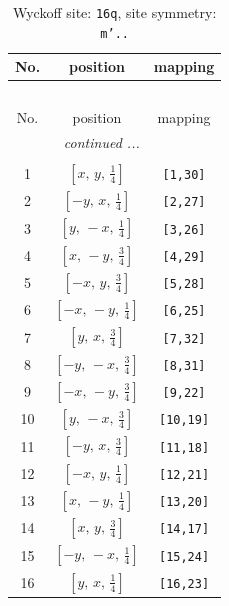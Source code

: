 \documentclass[fleqn,8pt]{jsarticle}
\begin{document}
\begin{longtable}{ccc}
\caption{Wyckoff site: {\tt 16q}, site symmetry: {\tt m'..}}
 \\
 \hline \hline
No. & position & mapping \\ \hline \endfirsthead

\multicolumn{2}{l}{\tablename\ \thetable{}} \\
 \hline \hline
No. & position & mapping \\ \hline \endhead

 \hline \hline
\multicolumn{2}{r}{\footnotesize\it continued ...} \\ \endfoot

 \hline \hline
\multicolumn{2}{r}{} \\ \endlastfoot

1 & $\left[ x,\, y,\, \frac{1}{4} \right]$ & {\tt [1,30]} \\ \hline
2 & $\left[ - y,\, x,\, \frac{1}{4} \right]$ & {\tt [2,27]} \\ \hline
3 & $\left[ y,\, - x,\, \frac{1}{4} \right]$ & {\tt [3,26]} \\ \hline
4 & $\left[ x,\, - y,\, \frac{3}{4} \right]$ & {\tt [4,29]} \\ \hline
5 & $\left[ - x,\, y,\, \frac{3}{4} \right]$ & {\tt [5,28]} \\ \hline
6 & $\left[ - x,\, - y,\, \frac{1}{4} \right]$ & {\tt [6,25]} \\ \hline
7 & $\left[ y,\, x,\, \frac{3}{4} \right]$ & {\tt [7,32]} \\ \hline
8 & $\left[ - y,\, - x,\, \frac{3}{4} \right]$ & {\tt [8,31]} \\ \hline
9 & $\left[ - x,\, - y,\, \frac{3}{4} \right]$ & {\tt [9,22]} \\ \hline
10 & $\left[ y,\, - x,\, \frac{3}{4} \right]$ & {\tt [10,19]} \\ \hline
11 & $\left[ - y,\, x,\, \frac{3}{4} \right]$ & {\tt [11,18]} \\ \hline
12 & $\left[ - x,\, y,\, \frac{1}{4} \right]$ & {\tt [12,21]} \\ \hline
13 & $\left[ x,\, - y,\, \frac{1}{4} \right]$ & {\tt [13,20]} \\ \hline
14 & $\left[ x,\, y,\, \frac{3}{4} \right]$ & {\tt [14,17]} \\ \hline
15 & $\left[ - y,\, - x,\, \frac{1}{4} \right]$ & {\tt [15,24]} \\ \hline
16 & $\left[ y,\, x,\, \frac{1}{4} \right]$ & {\tt [16,23]} \\
\end{longtable}
\end{document}
